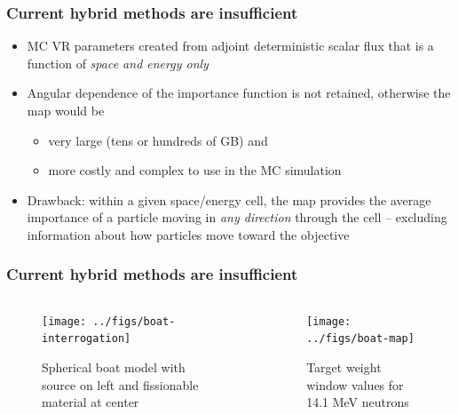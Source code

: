 \documentclass[xcolor=x11names,compress, handout]{beamer}
\renewcommand{\(}{\begin{columns}}
\renewcommand{\)}{\end{columns}}
\newcommand{\<}[1]{\begin{column}{#1}}
\renewcommand{\>}{\end{column}}
\begin{document}
\begin{frame}[fragile]
  \frametitle{Current hybrid methods are insufficient}

	\begin{itemize}
	\item MC VR parameters created from adjoint deterministic scalar flux that is a function of \textit{space and energy only} \vspace*{1 em}
	\item Angular dependence of the importance function is not retained, otherwise the map would be 
	\begin{itemize}
	  \item very large (tens or hundreds of GB) and
	  \item  more costly and complex to use in the MC simulation 
	\end{itemize}
	\item Drawback: within a given space/energy cell, the map provides the average importance of a particle moving in \textit{any direction} through the cell -- excluding information about how particles move \alert{toward the objective}
	\end{itemize}

\end{frame}


\begin{frame}[fragile]
  \frametitle{Current hybrid methods are insufficient}

	\begin{columns}
  	\begin{column}{0.5\textwidth}
 	 \begin{center}
 	 \begin{figure}
 	 \texttt{[image: ../figs/boat-interrogation]}  
 	 \caption{Spherical boat model with source on left and fissionable material at center}
 	 \end{figure}
 	 \end{center}
  	\end{column}
 	\begin{column}{0.5\textwidth}
 	 \begin{center}
 	 \begin{figure}
 	 \texttt{[image: ../figs/boat-map]}  
 	 \caption{Target weight window values for 14.1 MeV neutrons}
 	 \end{figure}
 	 \end{center}
  	\end{column}
	\end{columns}

\end{frame}
\end{document}

